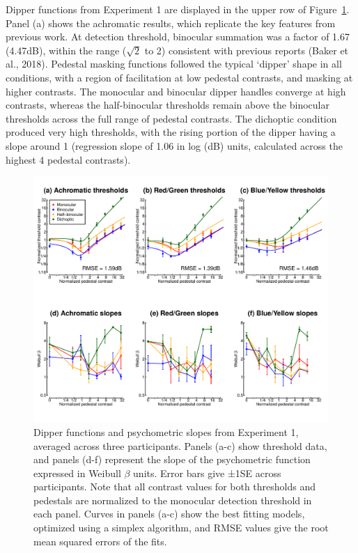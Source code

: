 \documentclass[
  letterpaper,
  DIV=11,
  numbers=noendperiod]{scrartcl}
\begin{document}
Dipper functions from Experiment 1 are displayed in the upper row of
Figure~\ref{fig-dipperfig}. Panel (a) shows the achromatic results,
which replicate the key features from previous work. At detection
threshold, binocular summation was a factor of 1.67 (4.47dB), within the
range (\(\sqrt{2}\) to 2) consistent with previous reports (Baker et
al., 2018). Pedestal masking functions followed the typical `dipper'
shape in all conditions, with a region of facilitation at low pedestal
contrasts, and masking at higher contrasts. The monocular and binocular
dipper handles converge at high contrasts, whereas the half-binocular
thresholds remain above the binocular thresholds across the full range
of pedestal contrasts. The dichoptic condition produced very high
thresholds, with the rising portion of the dipper having a slope around
1 (regression slope of 1.06 in log (dB) units, calculated across the
highest 4 pedestal contrasts).

\begin{figure}

{\centering \includegraphics{Figures/dipperssimplex.pdf}

}

\caption{\label{fig-dipperfig}Dipper functions and psychometric slopes
from Experiment 1, averaged across three participants. Panels (a-c) show
threshold data, and panels (d-f) represent the slope of the psychometric
function expressed in Weibull \(\beta\) units. Error bars give ±1SE
across participants. Note that all contrast values for both thresholds
and pedestals are normalized to the monocular detection threshold in
each panel. Curves in panels (a-c) show the best fitting models,
optimized using a simplex algorithm, and RMSE values give the root mean
squared errors of the fits.}

\end{figure}
\end{document}

